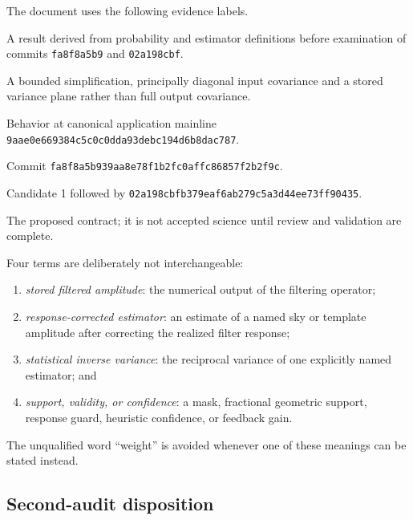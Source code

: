 \documentclass[11pt]{article}
\newcommand{\code}[1]{\nolinkurl{#1}}
\begin{document}
The document uses the following evidence labels.
\begin{description}[style=nextline]
\item[Independent contract] A result derived from probability and estimator
definitions before examination of commits \code{fa8f8a5b9} and
\code{02a198cbf}.
\item[Citlali approximation] A bounded simplification, principally diagonal
input covariance and a stored variance plane rather than full output
covariance.
\item[Baseline] Behavior at canonical application mainline
\code{9aae0e669384c5c0c0dda93debc194d6b8dac787}.
\item[Candidate 1] Commit \code{fa8f8a5b939aa8e78f1b2fc0affc86857f2b2f9c}.
\item[Candidate stack] Candidate 1 followed by
\code{02a198cbfb379eaf6ab279c5a3d44ee73ff90435}.
\item[Recommendation] The proposed contract; it is not accepted science until
review and validation are complete.
\end{description}

Four terms are deliberately not interchangeable:
\begin{enumerate}
\item \emph{stored filtered amplitude}: the numerical output of the filtering
operator;
\item \emph{response-corrected estimator}: an estimate of a named sky or
template amplitude after correcting the realized filter response;
\item \emph{statistical inverse variance}: the reciprocal variance of one
explicitly named estimator; and
\item \emph{support, validity, or confidence}: a mask, fractional geometric
support, response guard, heuristic confidence, or feedback gain.
\end{enumerate}
The unqualified word ``weight'' is avoided whenever one of these meanings can
be stated instead.

\subsection{Second-audit disposition}
\end{document}
